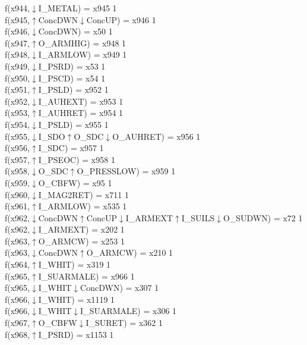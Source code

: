 f(x944,$\downarrow$I\_METAL) = x945 {1} \\
f(x945,$\uparrow$ConcDWN$\downarrow$ConcUP) = x946 {1} \\
f(x946,$\downarrow$ConcDWN) = x50 {1} \\
f(x947,$\uparrow$O\_ARMHIG) = x948 {1} \\
f(x948,$\downarrow$I\_ARMLOW) = x949 {1} \\
f(x949,$\downarrow$I\_PSRD) = x53 {1} \\
f(x950,$\downarrow$I\_PSCD) = x54 {1} \\
f(x951,$\uparrow$I\_PSLD) = x952 {1} \\
f(x952,$\downarrow$I\_AUHEXT) = x953 {1} \\
f(x953,$\uparrow$I\_AUHRET) = x954 {1} \\
f(x954,$\downarrow$I\_PSLD) = x955 {1} \\
f(x955,$\downarrow$I\_SDO$\uparrow$O\_SDC$\downarrow$O\_AUHRET) = x956 {1} \\
f(x956,$\uparrow$I\_SDC) = x957 {1} \\
f(x957,$\uparrow$I\_PSEOC) = x958 {1} \\
f(x958,$\downarrow$O\_SDC$\uparrow$O\_PRESSLOW) = x959 {1} \\
f(x959,$\downarrow$O\_CBFW) = x95 {1} \\
f(x960,$\downarrow$I\_MAG2RET) = x711 {1} \\
f(x961,$\uparrow$I\_ARMLOW) = x535 {1} \\
f(x962,$\downarrow$ConcDWN$\uparrow$ConcUP$\downarrow$I\_ARMEXT$\uparrow$I\_SUILS$\downarrow$O\_SUDWN) = x72 {1} \\
f(x962,$\downarrow$I\_ARMEXT) = x202 {1} \\
f(x963,$\uparrow$O\_ARMCW) = x253 {1} \\
f(x963,$\downarrow$ConcDWN$\uparrow$O\_ARMCW) = x210 {1} \\
f(x964,$\uparrow$I\_WHIT) = x319 {1} \\
f(x965,$\uparrow$I\_SUARMALE) = x966 {1} \\
f(x965,$\downarrow$I\_WHIT$\downarrow$ConcDWN) = x307 {1} \\
f(x966,$\downarrow$I\_WHIT) = x1119 {1} \\
f(x966,$\downarrow$I\_WHIT$\downarrow$I\_SUARMALE) = x306 {1} \\
f(x967,$\uparrow$O\_CBFW$\downarrow$I\_SURET) = x362 {1} \\
f(x968,$\uparrow$I\_PSRD) = x1153 {1} \\
